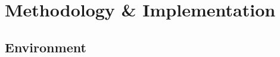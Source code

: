 \chapter{Methodology \& Implementation} \label{ch:method}
\begin{comment}
It may include: Description of the methodological, theoretical, conceptual or empirical framework; design of the
experiment; relevant steps of reasoning; data description and sources.
Describe the approach and method(s) used to address the scientific problem. Also reflect on the particular choice of method and justify it.

\end{comment}


\section{Environment}
\label{sec:environment}

